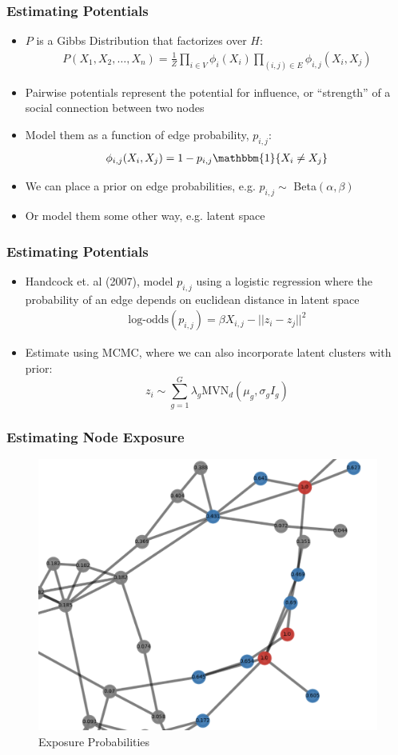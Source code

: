 \documentclass[
	11pt, %
]{beamer}
\begin{document}
\begin{frame}
	\frametitle{Estimating Potentials}
	\begin{itemize}
		\item $P$ is a Gibbs Distribution that factorizes over $H$: \begin{align*}
			P(X_1, X_2, \dots, X_n) = \frac{1}{Z} \prod_{i \in V} \phi_i(X_i)\prod_{(i, j) \in E}\phi_{i,j}(X_i, X_j) 
		\end{align*}
		\item Pairwise potentials represent the potential for influence, or ``strength'' of a social connection between two nodes
		\item Model them as a function of edge probability, $p_{i,j}$: \begin{align*}
			\phi_{i,j}(X_i, X_j) = 1 - p_{i,j}\mathbbm{1}\{{X_i \neq X_j}\}
		\end{align*}
		\item We can place a prior on edge probabilities, e.g. $p_{i,j} \sim $ Beta$(\alpha, \beta)$
		\item Or model them some other way, e.g. latent space 
	\end{itemize}
\end{frame}

\begin{frame}
	\frametitle{Estimating Potentials}
	\begin{itemize}
		\item Handcock et. al (2007), model $p_{i,j}$ using a logistic regression where the probability of an edge depends on euclidean distance in latent space \begin{align*}
			\mbox{log-odds}(p_{i,j}) = \beta X_{i,j} - ||z_i - z_j||^2
		\end{align*}
		\item Estimate using MCMC, where we can also incorporate latent clusters with prior: \begin{displaymath}
		z_i \sim \sum_{g = 1}^{G}\lambda_g \mbox{MVN}_d(\mu_g, \sigma_gI_g) 
	  \end{displaymath}
	\end{itemize}
\end{frame}


\begin{frame}
	\frametitle{Estimating Node Exposure}
	\begin{figure}
		\includegraphics[width=0.7\linewidth]{example.png}
		\caption{Exposure Probabilities}
	\end{figure}
\end{frame}
\end{document}
